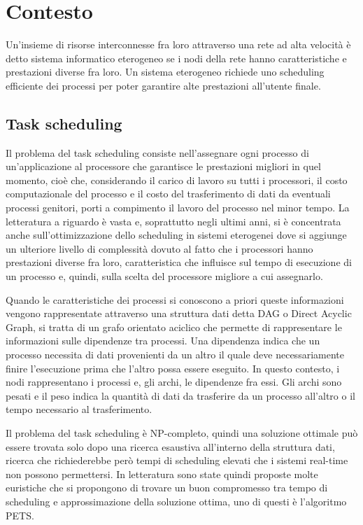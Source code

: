 \chapter{Contesto}
\vspace{4cm}
Un'insieme di risorse interconnesse fra loro attraverso una rete ad alta velocità è detto sistema informatico eterogeneo se i nodi della rete hanno caratteristiche e prestazioni diverse fra loro.
Un sistema eterogeneo richiede uno scheduling efficiente dei processi per poter garantire alte prestazioni all'utente finale.

\section{Task scheduling}
Il problema del task scheduling consiste nell'assegnare ogni processo di un'applicazione al processore che garantisce le prestazioni migliori in quel momento, cioè che, considerando il carico di lavoro su tutti i processori, il costo computazionale del processo e il costo del trasferimento di dati da eventuali processi genitori, porti a compimento il lavoro del processo nel minor tempo.
La letteratura a riguardo è vasta e, soprattutto negli ultimi anni, si è concentrata anche sull'ottimizzazione dello scheduling in sistemi eterogenei dove si aggiunge un ulteriore livello di complessità dovuto al fatto che i processori hanno prestazioni diverse fra loro, caratteristica che influisce sul tempo di esecuzione di un processo e, quindi, sulla scelta del processore migliore a cui assegnarlo.

Quando le caratteristiche dei processi si conoscono a priori queste informazioni vengono rappresentate attraverso una struttura dati detta DAG o Direct Acyclic Graph, si tratta di un grafo orientato aciclico che permette di rappresentare le informazioni sulle dipendenze tra processi. Una dipendenza indica che un processo necessita di dati provenienti da un altro il quale deve necessariamente finire l'esecuzione prima che l'altro possa essere eseguito.
In questo contesto, i nodi rappresentano i processi e, gli archi, le dipendenze fra essi. Gli archi sono pesati e il peso indica la quantità di dati da trasferire da un processo all'altro o il tempo necessario al trasferimento.

Il problema del task scheduling è NP-completo\cite{ULLMAN1975384}, quindi una soluzione ottimale può essere trovata solo dopo una ricerca esaustiva all'interno della struttura dati, ricerca che richiederebbe però tempi di scheduling elevati che i sistemi real-time non possono permettersi. 
In letteratura sono state quindi proposte molte euristiche che si propongono di trovare un buon compromesso tra tempo di scheduling e approssimazione della soluzione ottima, uno di questi è l'algoritmo PETS\cite{ilavarasan2007low}.


